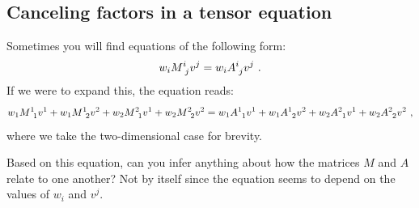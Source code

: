 \begin{subappendices}
\section{Canceling factors in a tensor equation}

\begin{wide}
Sometimes you will find equations of the following form:
\begin{align}
    w_i M\aij{i}{j}v^j = w_i A\aij{i}{j}v^j \ .
    \label{eq:canceling:factors:wMv}
\end{align}
If we were to expand this, the equation reads:
\begin{align}
    w_1 M\aij{1}{1}v^1 + w_1 M\aij{1}{2}v^2
    + w_2 M\aij{2}{1}v^1 + w_2 M\aij{2}{2}v^2
    =
    w_1 A\aij{1}{1}v^1 + w_1 A\aij{1}{2}v^2
    + w_2 A\aij{2}{1}v^1 + w_2 A\aij{2}{2}v^2 \ ,
    \label{eq:canceling:factors:wMv:long}
\end{align}
where we take the two-dimensional case for brevity. 
\end{wide}

Based on this equation, can you infer anything about how the matrices $M$ and $A$ relate to one another? Not by itself since the equation seems to depend on the values of $w_i$ and $v^j$. 


\end{subappendices}
